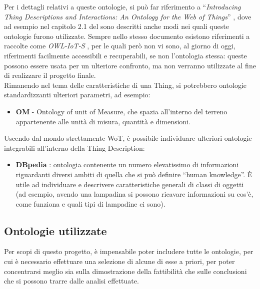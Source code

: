 \documentclass[12pt,a4paper,openright,oneside]{report}
\newcommand{\quotes}[1]{``#1''}
\begin{document}
Per i dettagli relativi a queste ontologie, si può far riferimento a  \quotes{\textit{Introducing Thing Descriptions and Interactions: An Ontology for the Web of Things}} \cite{td-paper2}, dove ad esempio nel capitolo 2.1 del sono descritti anche modi nei quali queste ontologie furono utilizzate. Sempre nello stesso documento esistono riferimenti a raccolte come \textit{OWL-IoT-S} \cite{owliot}, per le quali però non vi sono, al giorno di oggi, riferimenti facilmente accessibili e recuperabili, se non l'ontologia stessa: queste possono essere usata per un ulteriore confronto, ma non verranno utilizzate al fine di realizzare il progetto finale.\\

Rimanendo nel tema delle caratteristiche di una Thing, si potrebbero ontologie standardizzanti ulteriori parametri, ad esempio:
\begin{itemize}
	\item \textbf{OM} - Ontology of unit of Measure, che spazia all'interno del terreno appartenente alle unità di misura, quantità e dimensioni.
\end{itemize}

Uscendo dal mondo strettamente WoT, è possibile individuare ulteriori ontologie integrabili all'interno della Thing Description:
\begin{itemize}
	\item \textbf{DBpedia} \cite{dbpedia}: ontologia contenente un numero elevatissimo di informazioni riguardanti diversi ambiti di quella che si può definire \quotes{human knowledge}. È utile ad individuare e descrivere caratteristiche generali di classi di oggetti (ad esempio, avendo una lampadina si possono ricavare informazioni su cos'è, come funziona e quali tipi di lampadine ci sono).
\end{itemize}


\subsection{Ontologie utilizzate}
Per scopi di questo progetto, è impensabile poter includere tutte le ontologie, per cui è necessario effettuare una selezione di alcune di esse a priori, per poter concentrarsi meglio sia sulla dimostrazione della fattibilità che sulle conclusioni che si possono trarre dalle analisi effettuate.\\
\end{document}

